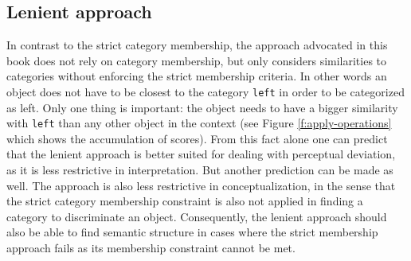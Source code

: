 \subsection{Lenient approach}
In contrast to the strict category membership, the approach 
advocated in this book does not rely on category membership, 
but only considers similarities to categories without enforcing the strict
membership criteria. In other words an object does not have to be closest
to the category {\footnotesize\tt left} in order to be categorized as left. Only one 
thing is important: the object needs to have a bigger similarity with 
{\footnotesize\tt left} than any other object in the context (see Figure 
\ref{f:apply-operations} which shows the accumulation of scores).
From this fact alone one can predict that the lenient approach
is better suited for dealing with perceptual deviation, as it is less 
restrictive in interpretation. But another prediction can be made as
well. The approach is also less restrictive in conceptualization,
in the sense that the strict category membership constraint is
also not applied in finding a category to discriminate an object.
Consequently, the lenient approach should also be able 
to find semantic structure in cases where the strict membership
approach fails as its membership constraint cannot be met.

